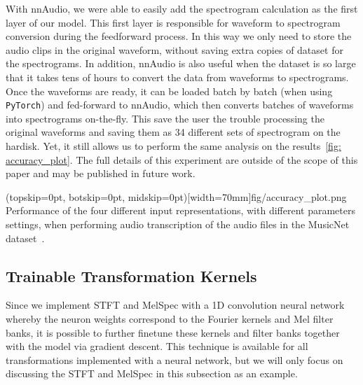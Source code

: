 \documentclass{ieeeaccess}
\newcommand{\nbh}[1]{\texttt{#1}}
\begin{document}
With nnAudio, we were able to easily add the spectrogram calculation as the first layer of our model. This first layer is responsible for waveform to spectrogram conversion during the feedforward process. In this way we only need to store the audio clips in the original waveform, without saving extra copies of dataset for the spectrograms. In addition, nnAudio is also useful when the dataset is so large that it takes tens of hours to convert the data from waveforms to spectrograms. Once the waveforms are ready, it can be loaded batch by batch (when using \nbh{PyTorch}) and fed-forward to nnAudio, which then converts batches of waveforms into spectrograms on-the-fly. This save the user the trouble processing the original waveforms and saving them as 34 different sets of spectrogram on the hardisk. Yet, it still allows us to perform the same analysis on the results~\ref{fig: accuracy_plot}. The full details of this experiment are outside of the scope of this paper and may be published in future work. 

\Figure(topskip=0pt, botskip=0pt, midskip=0pt)[width=70mm]{fig/accuracy_plot.png}
{Performance of the four different input representations, with different parameters settings, when performing audio transcription of the audio files in the MusicNet dataset~\cite{thickstun2017learning, thickstun2018invariances}.  \label{fig: accuracy_plot}}


\subsection{Trainable Transformation Kernels}\label{subsec:trainable}
Since we implement STFT and MelSpec with a 1D convolution neural network whereby the neuron weights correspond to the Fourier kernels and Mel filter banks, it is possible to further finetune these kernels and filter banks together with the model via gradient descent. This technique is available for all transformations implemented with a neural network, but we will only focus on discussing the STFT and MelSpec in this subsection as an example.
\end{document}

